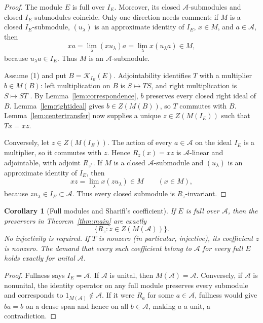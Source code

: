 \documentclass[11pt]{article}
\newtheorem{corollary}{Corollary}
\newcommand{\A}{\mathcal A}
\newcommand{\Icoeff}{I_E}
\newcommand{\Kcomp}{\mathcal K}
\begin{document}
\begin{proof}
The module $E$ is full over $\Icoeff$.  Moreover, its closed
$\A$-submodules and closed $\Icoeff$-submodules coincide.  Only one direction
needs comment: if $M$ is a closed $\Icoeff$-submodule, $(u_\lambda)$ is an
approximate identity of $\Icoeff$, $x\in M$, and $a\in\A$, then
\[
        xa=\lim_\lambda (xu_\lambda)a
          =\lim_\lambda x(u_\lambda a)\in M,
\]
because $u_\lambda a\in\Icoeff$.  Thus $M$ is an $\A$-submodule.

Assume (1) and put $B=\Kcomp_{\Icoeff}(E)$.  Adjointability identifies
$T$ with a multiplier $b\in M(B)$: left multiplication on $B$ is
$S\mapsto TS$, and right multiplication is $S\mapsto ST$
\cite{Lance}.  By Lemma~\ref{lem:correspondence}, $b$ preserves every closed right ideal of
$B$.  Lemma~\ref{lem:rightideal} gives $b\in Z(M(B))$, so $T$ commutes with
$B$.  Lemma~\ref{lem:centertransfer} now supplies a unique
$z\in Z(M(\Icoeff))$ such that $Tx=xz$.

Conversely, let $z\in Z(M(\Icoeff))$.  The action of every $a\in\A$ on the
ideal $\Icoeff$ is a multiplier, so it commutes with $z$.  Hence $R_z(x)=xz$
is $\A$-linear and adjointable, with adjoint $R_{z^*}$.  If $M$ is a closed
$\A$-submodule and $(u_\lambda)$ is an approximate identity of $\Icoeff$,
then
\[
             xz=\lim_\lambda x(zu_\lambda)\in M
             \qquad(x\in M),
\]
because $zu_\lambda\in\Icoeff\subset\A$.  Thus every closed submodule is
$R_z$-invariant.
\end{proof}

\begin{corollary}[Full modules and Sharifi's coefficient]\label{cor:source}
If $E$ is full over $\A$, then the preservers in
Theorem~\ref{thm:main} are exactly
\[
                  \{R_z:z\in Z(M(\A))\}.
\]
No injectivity is required.  If $T$ is nonzero (in particular, injective), its
coefficient $z$ is nonzero.  The demand that every such coefficient belong to
$\A$ for every full $E$ holds exactly for unital $\A$.
\end{corollary}

\begin{proof}
Fullness says $\Icoeff=\A$.  If $\A$ is unital, then
$M(\A)=\A$.  Conversely, if $\A$ is nonunital, the identity operator on any
full module preserves every submodule and corresponds to
$1_{M(\A)}\notin\A$.  If it were $R_a$ for some $a\in\A$, fullness would give
$ba=b$ on a dense span and hence on all $b\in\A$, making $a$ a unit, a
contradiction.
\end{proof}
\end{document}
